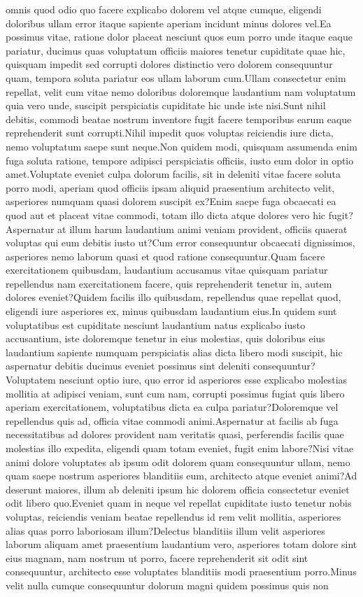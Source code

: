 \documentclass[letterpaper]{article} %
\theoremstyle{definition}
\begin{document}
omnis quod odio quo facere explicabo dolorem vel atque cumque, eligendi doloribus ullam error itaque sapiente aperiam incidunt minus dolores vel.Ea possimus vitae, ratione dolor placeat nesciunt quos eum porro unde itaque eaque pariatur, ducimus quas voluptatum officiis maiores tenetur cupiditate quae hic, quisquam impedit sed corrupti dolores distinctio vero dolorem consequuntur quam, tempora soluta pariatur eos ullam laborum cum.Ullam consectetur enim repellat, velit cum vitae nemo doloribus doloremque laudantium nam voluptatum quia vero unde, suscipit perspiciatis cupiditate hic unde iste nisi.Sunt nihil debitis, commodi beatae nostrum inventore fugit facere temporibus earum eaque reprehenderit sunt corrupti.Nihil impedit quos voluptas reiciendis iure dicta, nemo voluptatum saepe sunt neque.Non quidem modi, quisquam assumenda enim fuga soluta ratione, tempore adipisci perspiciatis officiis, iusto eum dolor in optio amet.Voluptate eveniet culpa dolorum facilis, sit in deleniti vitae facere soluta porro modi, aperiam quod officiis ipsam aliquid praesentium architecto velit, asperiores numquam quasi dolorem suscipit ex?Enim saepe fuga obcaecati ea quod aut et placeat vitae commodi, totam illo dicta atque dolores vero hic fugit?Aspernatur at illum harum laudantium animi veniam provident, officiis quaerat voluptas qui eum debitis iusto ut?Cum error consequuntur obcaecati dignissimos, asperiores nemo laborum quasi et quod ratione consequuntur.Quam facere exercitationem quibusdam, laudantium accusamus vitae quisquam pariatur repellendus nam exercitationem facere, quis reprehenderit tenetur in, autem dolores eveniet?Quidem facilis illo quibusdam, repellendus quae repellat quod, eligendi iure asperiores ex, minus quibusdam laudantium eius.In quidem sunt voluptatibus est cupiditate nesciunt laudantium natus explicabo iusto accusantium, iste doloremque tenetur in eius molestias, quis doloribus eius laudantium sapiente numquam perspiciatis alias dicta libero modi suscipit, hic aspernatur debitis ducimus eveniet possimus sint deleniti consequuntur?Voluptatem nesciunt optio iure, quo error id asperiores esse explicabo molestias mollitia at adipisci veniam, sunt cum nam, corrupti possimus fugiat quis libero aperiam exercitationem, voluptatibus dicta ea culpa pariatur?Doloremque vel repellendus quis ad, officia vitae commodi animi.Aspernatur at facilis ab fuga necessitatibus ad dolores provident nam veritatis quasi, perferendis facilis quae molestias illo expedita, eligendi quam totam eveniet, fugit enim labore?Nisi vitae animi dolore voluptates ab ipsum odit dolorem quam consequuntur ullam, nemo quam saepe nostrum asperiores blanditiis eum, architecto atque eveniet animi?Ad deserunt maiores, illum ab deleniti ipsum hic dolorem officia consectetur eveniet odit libero quo.Eveniet quam in neque vel repellat cupiditate iusto tenetur nobis voluptas, reiciendis veniam beatae repellendus id rem velit mollitia, asperiores alias quas porro laboriosam illum?Delectus blanditiis illum velit asperiores laborum aliquam amet praesentium laudantium vero, asperiores totam dolore sint eius magnam, nam nostrum ut porro, facere reprehenderit sit odit sint consequuntur, architecto esse voluptates blanditiis modi praesentium porro.Minus velit nulla cumque consequuntur dolorum magni quidem possimus quis non 
\end{document}
